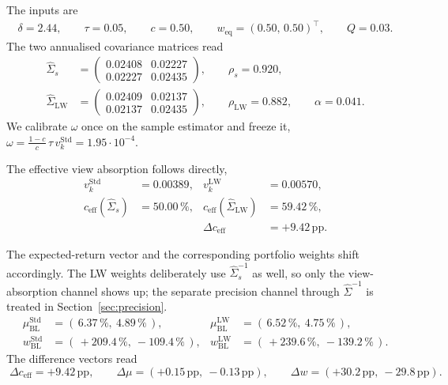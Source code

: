 \documentclass[a4paper,11pt]{article}
\theoremstyle{plain}
\theoremstyle{definition}
\newcommand{\Std}{\mathrm{Std}}
\newcommand{\LW}{\mathrm{LW}}
\newcommand{\eff}{\mathrm{eff}}
\begin{document}
The inputs are
\begin{align*}
    \delta = 2.44, \qquad \tau = 0.05, \qquad c = 0.50, \qquad
    w_{\mathrm{eq}} = (0.50,\,0.50)^\top, \qquad Q = 0.03.
\end{align*}
The two annualised covariance matrices read
\begin{align*}
    \hat{\Sigma}_s &= \begin{pmatrix} 0.02408 & 0.02227 \\ 0.02227 & 0.02435 \end{pmatrix},
    \qquad \rho_s = 0.920,\\
    \hat{\Sigma}_{\LW} &= \begin{pmatrix} 0.02409 & 0.02137 \\ 0.02137 & 0.02435 \end{pmatrix},
    \qquad \rho_{\LW} = 0.882, \qquad \alpha = 0.041.
\end{align*}
We calibrate $\omega$ once on the sample estimator and freeze it,
$\omega = \tfrac{1-c}{c}\,\tau\,v_k^\Std = 1.95 \cdot 10^{-4}$.

The effective view absorption follows directly,
\begin{align*}
    v_k^\Std &= 0.00389, & v_k^\LW &= 0.00570,\\
    c_{\eff}(\hat{\Sigma}_s) &= 50.00\,\%, & c_{\eff}(\hat{\Sigma}_{\LW}) &= 59.42\,\%,\\
    & & \Delta c_{\eff} &= +9.42\,\text{pp}.
\end{align*}

The expected-return vector and the corresponding portfolio weights shift
accordingly. The LW weights deliberately use $\hat{\Sigma}_s^{-1}$ as
well, so only the view-absorption channel shows up; the separate
precision channel through $\hat{\Sigma}^{-1}$ is treated in
Section~\ref{sec:precision}.
\begin{align*}
    \mu_{\mathrm{BL}}^\Std &= (\,6.37\,\%,\ 4.89\,\%\,), & \mu_{\mathrm{BL}}^\LW &= (\,6.52\,\%,\ 4.75\,\%\,),\\
    w_{\mathrm{BL}}^\Std &= (\,+209.4\,\%,\ -109.4\,\%\,), & w_{\mathrm{BL}}^\LW &= (\,+239.6\,\%,\ -139.2\,\%\,).
\end{align*}
The difference vectors read
\[
    \boxed{\;
    \Delta c_{\eff} = +9.42\,\text{pp}, \qquad
    \Delta\mu = (+0.15\,\text{pp},\ -0.13\,\text{pp}), \qquad
    \Delta w = (+30.2\,\text{pp},\ -29.8\,\text{pp}).
    \;}
\]
\end{document}

